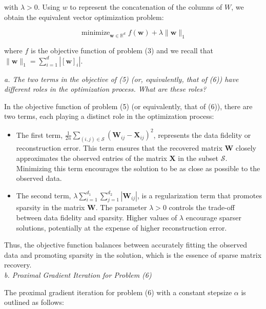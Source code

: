 \documentclass[12pt]{article}
\begin{document}
    with $\lambda>0$. Using $w$ to represent the concatenation of the columns of $W$, we obtain the equivalent vector optimization problem:

    \begin{equation}
        \operatorname{minimize}_{\boldsymbol{w} \in \mathbb{R}^{d}} f(\boldsymbol{w})+\lambda\|\boldsymbol{w}\|_{1}
    \end{equation}

    where $f$ is the objective function of problem (3) and we recall that $\|\boldsymbol{w}\|_{1}=\sum_{i=1}^{d}\left|[\boldsymbol{w}]_{i}\right|$.

    \textit{a. The two terms in the objective of (5) (or, equivalently, that of (6)) have different roles in the optimization process. What are these roles?}

    In the objective function of problem (5) (or equivalently, that of (6)), there are two terms, each playing a distinct role in the optimization process:

    \begin{itemize}
        \item The first term, \(\frac{1}{2 n} \sum_{(i, j) \in \mathcal{S}}\left(\boldsymbol{W}_{i j}-\boldsymbol{X}_{i j}\right)^{2}\), represents the data fidelity or reconstruction error. This term ensures that the recovered matrix \(\boldsymbol{W}\) closely approximates the observed entries of the matrix \(\boldsymbol{X}\) in the subset \(\mathcal{S}\). Minimizing this term encourages the solution to be as close as possible to the observed data.

        \item The second term, \(\lambda \sum_{i=1}^{d_{1}} \sum_{j=1}^{d_{2}}\left|\boldsymbol{W}_{i j}\right|\), is a regularization term that promotes sparsity in the matrix \(\boldsymbol{W}\). The parameter \(\lambda > 0\) controls the trade-off between data fidelity and sparsity. Higher values of \(\lambda\) encourage sparser solutions, potentially at the expense of higher reconstruction error.
    \end{itemize}

    Thus, the objective function balances between accurately fitting the observed data and promoting sparsity in the solution, which is the essence of sparse matrix recovery.\\

    \textit{b. Proximal Gradient Iteration for Problem (6)}

    The proximal gradient iteration for problem (6) with a constant stepsize \(\alpha\) is outlined as follows:
\end{document}

